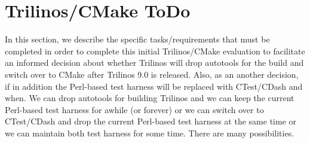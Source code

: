 

%
\section{Trilinos/CMake ToDo}
%

In this section, we describe the specific tasks/requirements that must
be completed in order to complete this initial Trilinos/CMake
evaluation to facilitate an informed decision about whether Trilinos
will drop autotools for the build and switch over to CMake after
Trilinos 9.0 is released.  Also, as an another decision, if in
addition the Perl-based test harness will be replaced with CTest/CDash
and when.  We can drop autotools for building Trilinos and we can keep
the current Perl-based test harness for awhile (or forever) or we can
switch over to CTest/CDash and drop the current Perl-based test
harness at the same time or we can maintain both test harness for some
time.  There are many possibilities.

